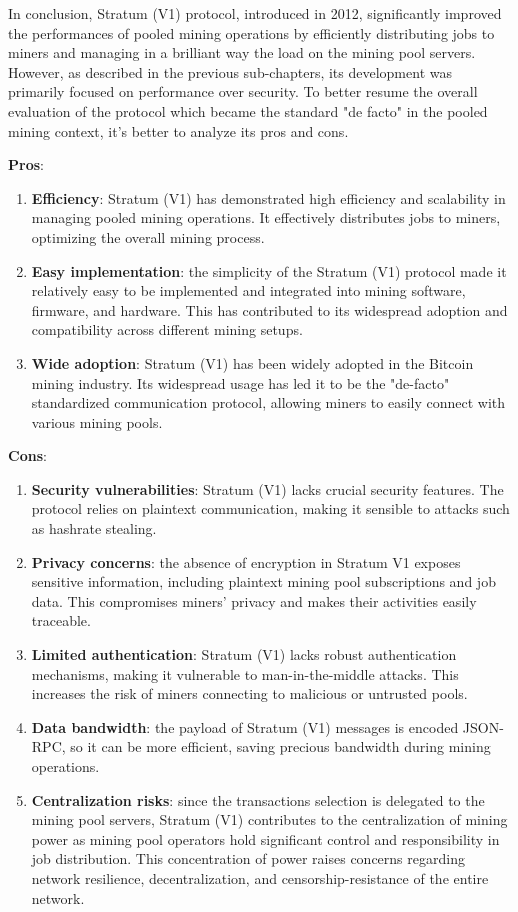 In conclusion, Stratum (V1) protocol, introduced in 2012, significantly improved the performances of pooled mining operations by efficiently distributing jobs to miners and managing in a brilliant way the load on the mining pool servers. However, as described in the previous sub-chapters, its development was primarily focused on performance over security. 
To better resume the overall evaluation of the protocol which became the standard "de facto" in the pooled mining context, it's better to analyze its pros and cons.
\medskip

\noindent \textbf{Pros}:
\begin{enumerate}
    \item \textbf{Efficiency}: Stratum (V1) has demonstrated high efficiency and scalability in managing pooled mining operations. It effectively distributes jobs to miners, optimizing the overall mining process.
    \item \textbf{Easy implementation}: the simplicity of the Stratum (V1) protocol made it relatively easy to be implemented and integrated into mining software, firmware, and hardware. This has contributed to its widespread adoption and compatibility across different mining setups.
    \item \textbf{Wide adoption}: Stratum (V1) has been widely adopted in the Bitcoin mining industry. Its widespread usage has led it to be the "de-facto" standardized communication protocol, allowing miners to easily connect with various mining pools.
\end{enumerate}
\medskip

\noindent \textbf{Cons}:
\begin{enumerate}
    \item \textbf{Security vulnerabilities}: Stratum (V1) lacks crucial security features. The protocol relies on plaintext communication, making it sensible to attacks such as hashrate stealing. 
    \item \textbf{Privacy concerns}: the absence of encryption in Stratum V1 exposes sensitive information, including plaintext mining pool subscriptions and job data. This compromises miners' privacy and makes their activities easily traceable.
    \item \textbf{Limited authentication}: Stratum (V1) lacks robust authentication mechanisms, making it vulnerable to man-in-the-middle attacks. This increases the risk of miners connecting to malicious or untrusted pools.
    \item \textbf{Data bandwidth}: the payload of Stratum (V1) messages is encoded JSON-RPC, so it can be more efficient, saving precious bandwidth during mining operations.
    \item \textbf{Centralization risks}: since the transactions selection is delegated to the mining pool servers, Stratum (V1) contributes to the centralization of mining power as mining pool operators hold significant control and responsibility in job distribution. This concentration of power raises concerns regarding network resilience, decentralization, and censorship-resistance of the entire network. 
\end{enumerate}

